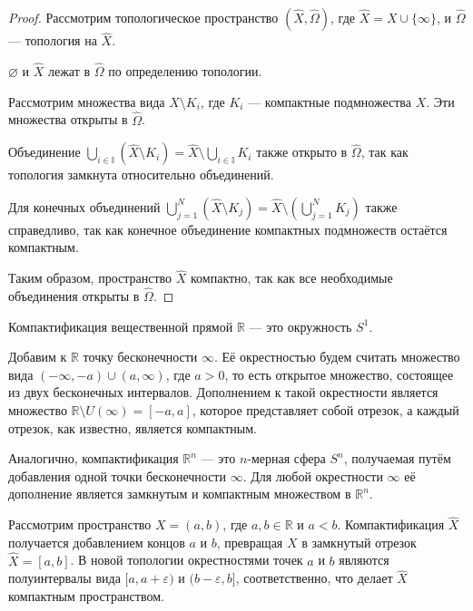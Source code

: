 \begin{proof}
	Рассмотрим топологическое пространство \( (\hat{X}, \hat{\Omega}) \), где \( \hat{X} = X \cup \{\infty\} \), и \( \hat{\Omega} \) — топология на \( \hat{X} \).

\( \displaystyle  \varnothing \) и \( \hat{X} \) лежат в \( \hat{\Omega} \) по определению топологии.

Рассмотрим множества вида \( \displaystyle \hat{X} \setminus K_i \), где \( K_i \) — компактные подмножества \( X \). Эти множества открыты в \( \hat{\Omega} \).

Объединение \(\displaystyle  \bigcup_{i \in \mathbb{I}} (\hat{X} \setminus K_i) = \hat{X} \setminus \bigcup_{i \in \mathbb{I}} K_i \) также открыто в \( \hat{\Omega} \), так как топология замкнута относительно объединений.

Для конечных объединений \(\displaystyle  \bigcup_{j = 1}^N (\hat{X} \setminus K_j) = \hat{X} \setminus \left( \bigcup_{j = 1}^N K_j \right) \) также справедливо, так как конечное объединение компактных подмножеств остаётся компактным.

Таким образом, пространство \( \hat{X} \) компактно, так как все необходимые объединения открыты в \( \hat{\Omega} \).

\end{proof}
	
\begin{example}
	Компактификация вещественной прямой \( \mathbb{R} \) — это окружность \( S^1 \). 
	
	Добавим к \( \mathbb{R} \) точку бесконечности \( \infty \). Её окрестностью будем считать множество вида \( (-\infty, -a) \cup (a, \infty) \), где \( a > 0 \), то есть открытое множество, состоящее из двух бесконечных интервалов. Дополнением к такой окрестности является множество \( \mathbb{R} \setminus U(\infty) = [-a, a] \), которое представляет собой отрезок, а каждый отрезок, как известно, является компактным.
	
	Аналогично, компактификация \( \mathbb{R}^n \) — это \( n \)-мерная сфера \( S^n \), получаемая путём добавления одной точки бесконечности \( \infty \). Для любой окрестности \( \infty \) её дополнение является замкнутым и компактным множеством в \( \mathbb{R}^n \).
	
	\end{example}
	
\begin{example}
Рассмотрим пространство \( X = (a, b) \), где \( a, b \in \mathbb{R} \) и \( a < b \). Компактификация \( \hat{X} \) получается добавлением концов \( a \) и \( b \), превращая \( X \) в замкнутый отрезок \( \hat{X} = [a, b] \). В новой топологии окрестностями точек \( a \) и \( b \) являются полуинтервалы вида \( [a, a+\varepsilon) \) и \( (b-\varepsilon, b] \), соответственно, что делает \( \hat{X} \) компактным пространством.
\end{example}
	

